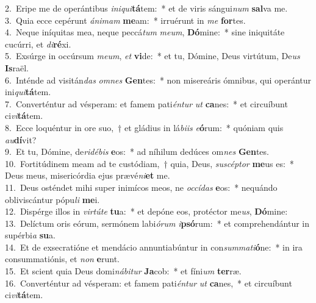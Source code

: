 {2.~}Eripe me de operántibus \textit{i}\textit{ni}\textit{qui}\textbf{tá}tem:~* et de viris sángui\textit{num} \textbf{sal}va me.\\
{3.~}Quia ecce cepérunt \textit{á}\textit{ni}\textit{mam} \textbf{me}am:~* irruérunt in \textit{me} \textbf{for}tes.\\
{4.~}Neque iníquitas mea, neque peccá\textit{tum} \textit{me}\textit{um}, \textbf{Dó}mine:~* sine iniquitáte cucúrri, et \textit{di}\textbf{ré}xi.\\
{5.~}Exsúrge in occúrsum \textit{me}\textit{um}, \textit{et} \textbf{vi}de:~* et tu, Dómine, Deus virtútum, De\textit{us} \textbf{Is}raël.\\
{6.~}Inténde ad visitán\textit{das} \textit{om}\textit{nes} \textbf{Gen}tes:~* non misereáris ómnibus, qui operántur ini\textit{qui}\textbf{tá}tem.\\
{7.~}Converténtur ad vésperam: et famem pati\textit{én}\textit{tur} \textit{ut} \textbf{ca}nes:~* et circuíbunt ci\textit{vi}\textbf{tá}tem.\\
{8.~}Ecce loquéntur in ore suo,~† et gládius in lá\textit{bi}\textit{is} \textit{e}\textbf{ó}rum:~* quóniam quis \textit{au}\textbf{dí}vit?\\
{9.~}Et tu, Dómine, de\textit{ri}\textit{dé}\textit{bis} \textbf{e}os:~* ad níhilum dedúces om\textit{nes} \textbf{Gen}tes.\\
{10.~}Fortitúdinem meam ad te custódiam,~† quia, Deus, \textit{su}\textit{scép}\textit{tor} \textbf{me}us es:~* Deus meus, misericórdia ejus prævé\textit{ni}\textbf{et} me.\\
{11.~}Deus osténdet mihi super inimícos meos, ne \textit{oc}\textit{cí}\textit{das} \textbf{e}os:~* nequándo obliviscántur pópu\textit{li} \textbf{me}i.\\
{12.~}Dispérge illos in \textit{vir}\textit{tú}\textit{te} \textbf{tu}a:~* et depóne eos, protéctor me\textit{us}, \textbf{Dó}mine:\\
{13.~}Delíctum oris eórum, sermónem labi\textit{ó}\textit{rum} \textit{i}\textbf{psó}rum:~* et comprehendántur in supérbi\textit{a} \textbf{su}a.\\
{14.~}Et de exsecratióne et mendácio annuntiabúntur in con\textit{sum}\textit{ma}\textit{ti}\textbf{ó}ne:~* in ira consummatiónis, et \textit{non} \textbf{e}runt.\\
{15.~}Et scient quia Deus domi\textit{ná}\textit{bi}\textit{tur} \textbf{Ja}cob:~* et fíni\textit{um} \textbf{ter}ræ.\\
{16.~}Converténtur ad vésperam: et famem pati\textit{én}\textit{tur} \textit{ut} \textbf{ca}nes,~* et circuíbunt ci\textit{vi}\textbf{tá}tem.\\
